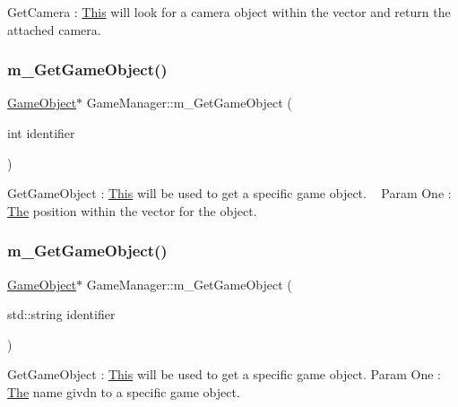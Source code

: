 Get\+Camera \+: \mbox{\hyperlink{class_this}{This}} will look for a camera object within the vector and return the attached camera. \mbox{\label{class_game_manager_a979b7881772a956be7cab1d05f00044e}} 
\subsubsection{\texorpdfstring{m\+\_\+\+Get\+Game\+Object()}{m\_GetGameObject()}\hspace{0.1cm}{\footnotesize\ttfamily [1/2]}}
{\footnotesize\ttfamily \mbox{\hyperlink{class_game_object}{Game\+Object}}$\ast$ Game\+Manager\+::m\+\_\+\+Get\+Game\+Object (\begin{DoxyParamCaption}\item[{int}]{identifier }\end{DoxyParamCaption})\hspace{0.3cm}{\ttfamily [inline]}}

Get\+Game\+Object \+: \mbox{\hyperlink{class_this}{This}} will be used to get a specific game object. ~\newline
Param One \+: \mbox{\hyperlink{class_the}{The}} position within the vector for the object. \mbox{\label{class_game_manager_ae80a0230548e9d9d5622c814b29ce55c}} 
\subsubsection{\texorpdfstring{m\+\_\+\+Get\+Game\+Object()}{m\_GetGameObject()}\hspace{0.1cm}{\footnotesize\ttfamily [2/2]}}
{\footnotesize\ttfamily \mbox{\hyperlink{class_game_object}{Game\+Object}}$\ast$ Game\+Manager\+::m\+\_\+\+Get\+Game\+Object (\begin{DoxyParamCaption}\item[{std\+::string}]{identifier }\end{DoxyParamCaption})\hspace{0.3cm}{\ttfamily [inline]}}

Get\+Game\+Object \+: \mbox{\hyperlink{class_this}{This}} will be used to get a specific game object. Param One \+: \mbox{\hyperlink{class_the}{The}} name givdn to a specific game object. \mbox{\label{class_game_manager_a6b5f37f418867bd5207c6cf126113f4a}} 
